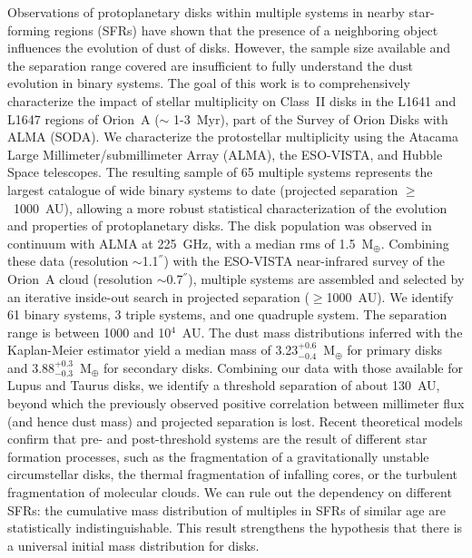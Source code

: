\documentclass{aa}
\begin{document}
  \abstract
   {Observations of protoplanetary disks within multiple systems in nearby star-forming regions (SFRs) have shown that the presence of a neighboring object influences the evolution of dust of disks. However, the sample size available and the separation range covered are insufficient to fully understand the dust evolution in binary systems.}
   {The goal of this work is to comprehensively characterize the impact of stellar multiplicity on Class~II disks in the L1641 and L1647 regions of Orion~A ($\sim$ 1-3~Myr), part of the Survey of Orion Disks with ALMA (SODA). We characterize the protostellar multiplicity using the Atacama Large Millimeter/submillimeter Array (ALMA), the ESO-VISTA, and Hubble Space telescopes. The resulting sample of 65 multiple systems represents the largest catalogue of wide binary systems to date (projected separation $\geq$~1000~AU), allowing a more robust statistical characterization of the evolution and properties of protoplanetary disks.}
   {The disk population was observed in continuum with ALMA at 225~GHz, with a median rms of 1.5~M$_{\oplus}$. Combining these data (resolution $\sim$1.1$^{''}$) with the ESO-VISTA near-infrared survey of the Orion~A cloud (resolution $\sim$0.7$^{''}$), multiple systems are assembled and selected by an iterative inside-out search in projected separation ($\geq$1000~AU).}
   {We identify 61 binary systems, 3 triple systems, and one quadruple system. The separation range is between 1000 and 10$^4$~AU. The dust mass distributions inferred with the Kaplan-Meier estimator yield a median mass of 3.23$^{+0.6}_{-0.4}$~M$_{\oplus}$ for primary disks and 3.88$^{+0.3}_{-0.3}$~M$_{\oplus}$ for secondary disks.}
   {Combining our data with those available for Lupus and Taurus disks, we identify a threshold separation of about 130~AU, beyond which the previously observed positive correlation between millimeter flux (and hence dust mass) and projected separation is lost. Recent theoretical models confirm that pre- and post-threshold systems are the result of different star formation processes, such as the fragmentation of a gravitationally unstable circumstellar disks, the thermal fragmentation of infalling cores, or the turbulent fragmentation of molecular clouds. We can rule out the dependency on different SFRs: the cumulative mass distribution of multiples in SFRs of similar age are statistically indistinguishable. This result strengthens the hypothesis that there is a universal initial mass distribution for disks.
   }
\end{document}

